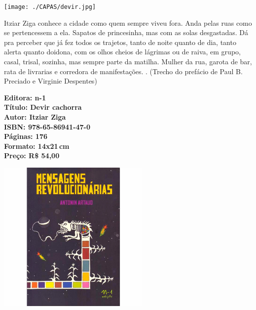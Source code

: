 \pagebreak

\begin{center}
\hspace*{.5cm}\texttt{[image: ./CAPAS/devir.jpg]}
\end{center}

\hspace*{-7cm}\hrulefill\hspace*{-7cm}

\medskip

\noindent{}Itziar Ziga conhece a cidade como quem sempre viveu fora. Anda pelas ruas como se pertencessem a ela. Sapatos de princesinha, mas com as solas desgastadas. Dá pra perceber que já fez todos os trajetos, tanto de noite quanto de dia, tanto alerta quanto doidona, com os olhos cheios de lágrimas ou de raiva, em grupo, casal, trisal, sozinha, mas sempre parte da matilha. Mulher da rua, garota de bar, rata de livrarias e corredora de manifestações. . (Trecho do prefácio de Paul B. Preciado e Virginie Despentes)

\vfill

\hspace*{-.4cm}\begin{minipage}[c]{.5\linewidth}
\small\textbf{
\hspace*{-.1cm}Editora: n-1\\
Título: Devir cachorra\\
Autor: Itziar Ziga\\
ISBN: 978-65-86941-47-0\\
Páginas: 176\\
Formato: 14x21\,cm\\
Preço: R\$ 54,00\\
}
\end{minipage}

\pagebreak

\begin{center}
\hspace*{-3.6cm}
\hspace*{3.1cm}\includegraphics[width=74mm]{./CAPAS/mensagens.jpg}
\end{center}

